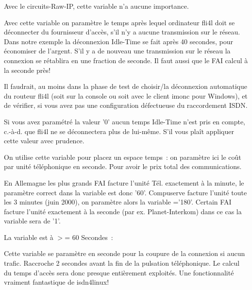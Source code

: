 \begin{description}
  Avec le circuits-Raw-IP, cette variable n'a aucune importance.


  Avec cette variable  on paramètre
  le temps après lequel ordinateur fli4l doit se déconnecter du fournisseur
  d'accès, s'il n'y a aucune transmission sur le réseau. Dans notre exemple
  la déconnexion Idle-Time se fait après 40 secondes, pour économiser de l'argent.
  S'il y a de nouveau une transmission sur le réseau la connexion se rétablira
  en une fraction de seconde. Il faut aussi que le FAI calcul à la seconde près!

  Il faudrait, au moins dans la phase de test de choisir/la déconnexion
  automatique du routeur fli4l (soit sur la console ou soit avec le client
  imonc pour Windows), et de vérifier, si vous avez pas une configuration
  défectueuse du raccordement ISDN.

  Si vous avez paramétré la valeur '0' aucun temps Idle-Time n'est pris en
  compte, c.-à-d. que fli4l ne se déconnectera plus de lui-même. S'il vous
  plaît appliquer cette valeur avec prudence.


  On utilise cette variable pour placez un espace temps~: on paramètre ici le
  coût par unité téléphonique en seconde. Pour avoir le prix total des communications.

  En Allemagne les plus grands FAI facture l'unité Tél. exactement à la minute, le
  paramètre correct dans la variable est donc '60'. Compuserve facture l'unité
  toute les 3 minutes (juin 2000), on paramètre alors la variable
  \linebreak {}='180'. Certain FAI facture l'unité
  exactement à la seconde (par ex. Planet-Interkom) dans ce cas la variable
   sera de '1'.

  La variable est à  $>$= 60 Secondes~:

  Cette variable  se paramètre en seconde
  pour la coupure de la connexion si aucun trafic. Raccroche 2 secondes avant la fin
  de la pulsation téléphonique. Le calcul du temps d'accès sera donc presque entièrement
  exploités. Une fonctionnalité vraiment fantastique de isdn4linux!


\end{description}
